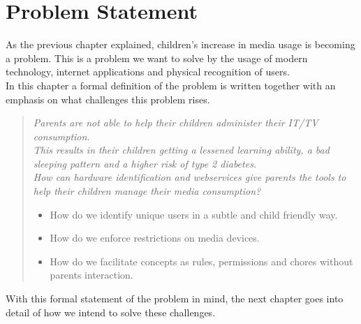 \chapter{Problem Statement}
As the previous chapter explained, children's increase in media usage is becoming a problem. This is a problem we want to solve by the usage of modern technology, internet applications and physical recognition of users.\\
In this chapter a formal definition of the problem is written together with an emphasis on what challenges this problem rises.\\


\begin{verse}
\textit{Parents are not able to help their children administer their IT/TV consumption.\\
This results in their children getting a lessened learning ability, a bad sleeping pattern and a higher risk of type 2 diabetes.\\
How can hardware identification and webservices give parents the tools to help their children manage their media consumption?}
	\begin{itemize}
		\item How do we identify unique users in a subtle and child friendly way.
		\item How do we enforce restrictions on media devices.
		\item How do we facilitate concepts as rules, permissions and chores without parents interaction.
	\end{itemize}
\end{verse}


With this formal statement of the problem in mind, the next chapter goes into detail of how we intend to solve these challenges.


